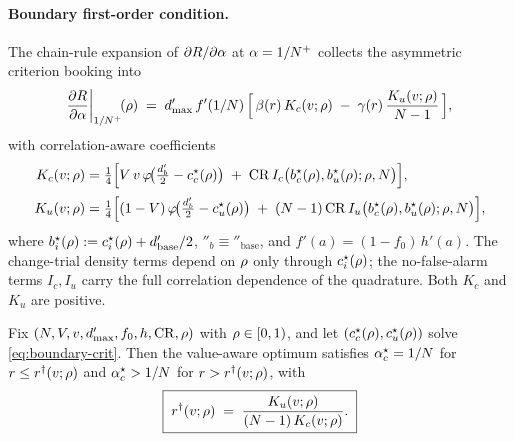 \paragraph{Boundary first-order condition.}
The chain-rule expansion of $\partial R / \partial\alpha$ at
$\alpha = 1/N^{+}$ collects the asymmetric criterion booking into
\begin{equation}
  \frac{\partial R}{\partial\alpha}\bigg|_{1/N^{+}}\!(\rho)
  \;=\;
  d'_{\max}\, f'(1/N)\,
  \Bigl[\,\beta(r)\,K_c(v; \rho)
        \;-\; \gamma(r)\,\frac{K_u(v; \rho)}{N - 1}\,\Bigr],
  \label{eq:boundary-foc-rho}
\end{equation}
with correlation-aware coefficients
\begin{align}
  K_c(v; \rho)
  &= \tfrac{1}{4}\Big[V\,v\,
       \varphi\!\big(\tfrac{d'_b}{2} - c_c^\star(\rho)\big)
       \;+\; \mathrm{CR}\,
       I_c\bigl(b_c^\star(\rho), b_u^\star(\rho); \rho, N\bigr)\Big],
  \label{eq:Kc-rho}
  \\[2pt]
  K_u(v; \rho)
  &= \tfrac{1}{4}\Big[(1 - V)\,
       \varphi\!\big(\tfrac{d'_b}{2} - c_u^\star(\rho)\big)
       \;+\; (N - 1)\,\mathrm{CR}\,
       I_u\bigl(b_c^\star(\rho), b_u^\star(\rho); \rho, N\bigr)\Big],
  \label{eq:Ku-rho}
\end{align}
where $b_i^\star(\rho) := c_i^\star(\rho) + d'_{\mathrm{base}}/2$,
$\dprime_b \equiv \dprime_{\mathrm{base}}$, and $f'(a) = (1 - f_0)\,h'(a)$.
The change-trial density terms depend on $\rho$ only through
$c_i^\star(\rho)$; the no-false-alarm terms $I_c, I_u$ carry the full
correlation dependence of the quadrature. Both $K_c$ and $K_u$ are
positive.

\begin{proposition}
\label{prop:escape-rho}
Fix $(N, V, v, d'_{\max}, f_0, h, \mathrm{CR}, \rho)$ with
$\rho \in [0, 1)$, and let $(c_c^\star(\rho), c_u^\star(\rho))$ solve
\eqref{eq:boundary-crit}. Then the value-aware optimum satisfies
$\alpha_c^\star = 1/N$ for $r \le r^{\dagger}(v; \rho)$ and
$\alpha_c^\star > 1/N$ for $r > r^{\dagger}(v; \rho)$, with
\begin{equation}
  \boxed{\;
    r^{\dagger}(v; \rho)
    \;=\;
    \frac{K_u(v; \rho)}{(N - 1)\,K_c(v; \rho)}.
  \;}
  \label{eq:r-dagger-rho}
\end{equation}
\end{proposition}

